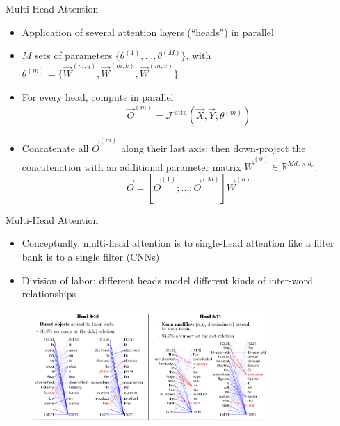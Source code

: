 \begin{vbframe}{Multi-Head Attention}

\vfill

\begin{itemize}
\item Application of several attention layers (``heads'') in parallel
\item $M$ sets of parameters $\{\theta^{(1)}, \ldots, \theta^{(M)}\}$, with $\theta^{(m)} = \{\vec {W}^{(m,q)}, \vec {W}^{(m,k)}, \vec {W}^{(m,v)}\}$
\item For every head, compute in parallel:
$$ \vec O^{(m)} = \mathcal{F}^\mathrm{attn}(\vec X, \vec Y; \theta^{(m)}) $$
\item Concatenate all $\vec {O}^{(m)}$ along their last axis; then down-project the concatenation with an additional parameter matrix $\vec W^{(o)} \in \mathbb{R}^{Md_v \times d_v}$:
$$ \vec O = [\vec O^{(1)}; \ldots;  \vec O^{(M)}] \vec W^{(o)}$$
\end{itemize}

\vfill

\end{vbframe}


\begin{vbframe}{Multi-Head Attention}

\vfill

\begin{itemize}
\item Conceptually, multi-head attention is to single-head attention like a filter bank is to a single filter (CNNs)
\item Division of labor: different heads model different kinds of inter-word relationships
\end{itemize}

	\begin{figure}
		\centering
		\includegraphics[width = 9cm]{figure/heads.png}\\ 
	\end{figure}

\vfill

\end{vbframe}


\endlecture



\begin{vbframe}{}

\vfill



\vfill

\end{vbframe}
